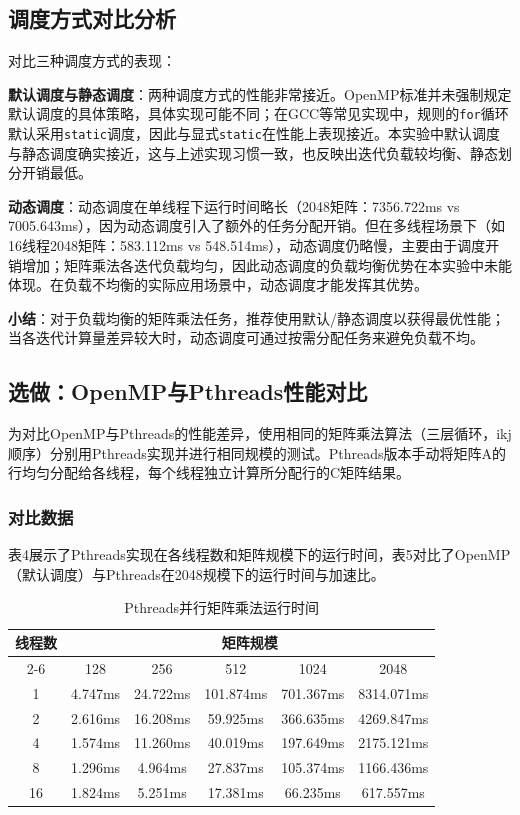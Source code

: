 \documentclass{SYSUReport}
\begin{document}
\subsection{调度方式对比分析}

对比三种调度方式的表现：

\textbf{默认调度与静态调度}：两种调度方式的性能非常接近。OpenMP标准并未强制规定默认调度的具体策略，具体实现可能不同；在GCC等常见实现中，规则的\texttt{for}循环默认采用\texttt{static}调度，因此与显式\texttt{static}在性能上表现接近。本实验中默认调度与静态调度确实接近，这与上述实现习惯一致，也反映出迭代负载较均衡、静态划分开销最低。

\textbf{动态调度}：动态调度在单线程下运行时间略长（2048矩阵：7356.722ms vs 7005.643ms），因为动态调度引入了额外的任务分配开销。但在多线程场景下（如16线程2048矩阵：583.112ms vs 548.514ms），动态调度仍略慢，主要由于调度开销增加；矩阵乘法各迭代负载均匀，因此动态调度的负载均衡优势在本实验中未能体现。在负载不均衡的实际应用场景中，动态调度才能发挥其优势。

\textbf{小结}：对于负载均衡的矩阵乘法任务，推荐使用默认/静态调度以获得最优性能；当各迭代计算量差异较大时，动态调度可通过按需分配任务来避免负载不均。

\subsection{选做：OpenMP与Pthreads性能对比}

为对比OpenMP与Pthreads的性能差异，使用相同的矩阵乘法算法（三层循环，ikj顺序）分别用Pthreads实现并进行相同规模的测试。Pthreads版本手动将矩阵A的行均匀分配给各线程，每个线程独立计算所分配行的C矩阵结果。

\subsubsection{对比数据}

表4展示了Pthreads实现在各线程数和矩阵规模下的运行时间，表5对比了OpenMP（默认调度）与Pthreads在2048规模下的运行时间与加速比。

\begin{table}[H]
\centering
\caption{Pthreads并行矩阵乘法运行时间}
\label{表4}
\begin{tabular}{|c|c|c|c|c|c|}
\hline
\multirow{2}{*}{线程数} & \multicolumn{5}{c|}{矩阵规模} \\ \cline{2-6}
 & 128 & 256 & 512 & 1024 & 2048 \\ \hline
1  & 4.747ms & 24.722ms & 101.874ms & 701.367ms & 8314.071ms \\ \hline
2  & 2.616ms & 16.208ms & 59.925ms & 366.635ms & 4269.847ms \\ \hline
4  & 1.574ms & 11.260ms & 40.019ms & 197.649ms & 2175.121ms \\ \hline
8  & 1.296ms & 4.964ms & 27.837ms & 105.374ms & 1166.436ms \\ \hline
16 & 1.824ms & 5.251ms & 17.381ms & 66.235ms & 617.557ms \\ \hline
\end{tabular}
\end{table}
\end{document}
